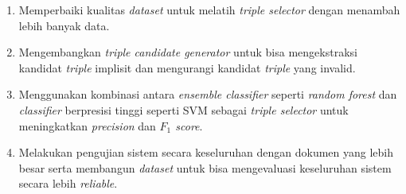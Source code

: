 \begin{enumerate}
	\item Memperbaiki kualitas \textit{dataset} untuk melatih \textit{triple selector} dengan menambah lebih banyak data.
	
	\item Mengembangkan \textit{triple candidate generator} untuk bisa mengekstraksi kandidat \textit{triple} implisit dan mengurangi kandidat \textit{triple} yang invalid.
	
	\item Menggunakan kombinasi antara \textit{ensemble classifier} seperti \textit{random forest} dan \textit{classifier} berpresisi tinggi seperti SVM sebagai \textit{triple selector} untuk meningkatkan \textit{precision} dan \textit{$F_1$ score}.
	
	\item Melakukan pengujian sistem secara keseluruhan dengan dokumen yang lebih besar serta membangun \textit{dataset} untuk bisa mengevaluasi keseluruhan sistem secara lebih \textit{reliable}.
\end{enumerate}
